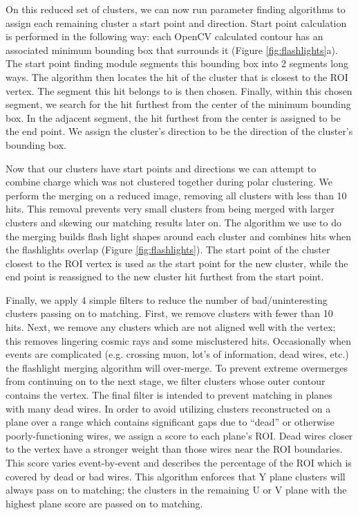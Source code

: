 \documentclass[a4paper]{article}
\begin{document}
\par On this reduced set of clusters, we can now run parameter finding algorithms to assign each remaining cluster a start point and direction. Start point calculation is performed in the following way: each OpenCV calculated contour has an associated minimum bounding box that surrounds it (Figure \ref{fig:flashlights}a). The start point finding module segments this bounding box into 2 segments long ways. The algorithm then locates the hit of the cluster that is closest to the ROI vertex.  The segment this hit belongs to is then chosen. Finally, within this chosen segment, we search for the hit furthest from the center of the minimum bounding box. In the adjacent segment, the hit furthest from the center is assigned to be the end point. We assign the cluster's direction to be the direction of the cluster's bounding box.
\par Now that our clusters have start points and directions we can attempt to combine charge which was not clustered together during polar clustering. We perform the merging on a reduced image, removing all clusters with less than 10 hits. This removal prevents very small clusters from being merged with larger clusters and skewing our matching results later on.  The algorithm we use to do the merging builds flash light shapes around each cluster and combines hits when the flashlights overlap (Figure \ref{fig:flashlights}). The start point of the cluster closest to the ROI vertex is used as the start point for the new cluster, while the end point is reassigned to the new cluster hit furthest from the start point.
\par Finally, we apply 4 simple filters to reduce the number of bad/uninteresting clusters passing on to matching. First, we remove clusters with fewer than 10 hits.  Next, we remove any clusters which are not aligned well with the vertex; this removes lingering cosmic rays and some misclustered hits. Occasionally when events are complicated (e.g. crossing muon, lot's of information, dead wires, etc.) the flashlight merging algorithm will over-merge.  To prevent extreme overmerges from continuing on to the next stage, we filter clusters whose outer contour contains the vertex. The final filter is intended to prevent matching in planes with many dead wires.  In order to avoid utilizing clusters reconstructed on a plane over a range which contains significant gaps due to ``dead'' or otherwise poorly-functioning wires, we assign a score to each plane's ROI. Dead wires closer to the vertex have a stronger weight than those wires near the ROI boundaries. This score varies event-by-event and describes the percentage of the ROI which is covered by dead or bad wires. This algorithm enforces that Y plane clusters will always pass on to matching; the clusters in the remaining U or V plane with the highest plane score are passed on to matching. 
\end{document}
